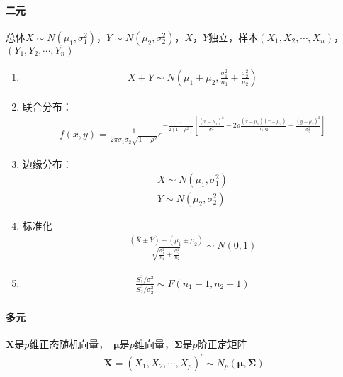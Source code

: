 \documentclass[12pt]{book}
\begin{document}
\paragraph{二元}

总体$X\sim N(\mu_1,\sigma_1^2)$，$Y\sim N(\mu_2,\sigma_2^2)$，$X$，$Y$独立，样本$(X_1,X_2,\cdots,X_n)$，$(Y_1,Y_2,\cdots,Y_n)$


\begin{enumerate}[1.]
    \item \begin{gather*}
        \overline{X}\pm\overline{Y}\sim N\left(\mu_1\pm \mu_2,\frac{\sigma_1^2}{n_1}+\frac{\sigma_2^2}{n_2}\right)
    \end{gather*}
    \item 联合分布：
    \begin{gather*}
        f(x,y) = \frac{1}{2\pi \sigma_1 \sigma_2\sqrt{1-\rho^2}} e^{
            -\frac{1}{2(1-\rho^2)}
            \left[\frac{(x-\mu_1)^2}{\sigma_1^2} - 2\rho \frac{(x-\mu_1)(x-\mu_2)}{\sigma_1 \sigma_2}+\frac{(y-\mu_2)^2}{\sigma_2^2} \right]
        }
    \end{gather*}
    \item 边缘分布：
    \begin{gather*}
        X\sim N(\mu_1,\sigma_1^2)\\
        Y\sim N(\mu_2,\sigma_2^2)
    \end{gather*}
    \item 标准化
    \begin{gather*}
        \frac{(\overline{X}\pm \overline{Y})-(\mu_1 \pm \mu_2)}{\sqrt{
            \frac{\sigma_1^2}{n_1}+\frac{\sigma_2^2}{n_2}
            }}\sim N(0,1)
    \end{gather*}
    \item \begin{gather*}
        \frac{S_1^2/\sigma_1^2}{S_2^2/\sigma_2^2}\sim F(n_1-1,n_2-1)
    \end{gather*}
\end{enumerate}




\paragraph{多元}

$\mathbf{X}$是$p$维正态随机向量，\ $\bm{\mu}$是$p$维向量，$\bm{\Sigma}$是$p$阶正定矩阵
\begin{gather*}
    \mathbf{X}
    = \left(X_1,X_2,\cdots,X_p\right)^\prime
    \sim N_p(\bm{\mu},\bm{\Sigma} )
\end{gather*}
\end{document}
